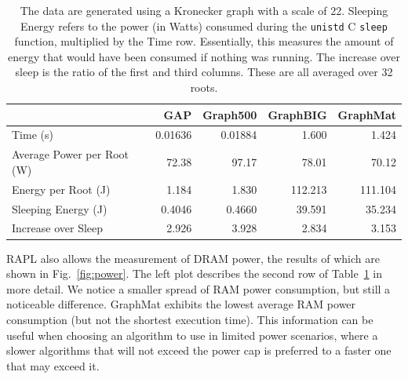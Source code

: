 \documentclass{llncs}
\begin{document}
\begin{table}
	\caption{The data are generated using a Kronecker graph with a scale of 22. Sleeping Energy refers to the power (in Watts) consumed during the \texttt{unistd} C \texttt{sleep} function, multiplied by the Time row. Essentially, this measures the amount of energy that would have been consumed if nothing was running. The increase over sleep is the ratio of the first and third columns. These are all averaged over 32 roots.}
	\centering
	\begin{tabular}{l|r|r|r|r}
			&	GAP  &    Graph500 & GraphBIG & GraphMat \\ \hline
		Time (s) &  0.01636 & 0.01884 & 1.600 & 1.424 \\
		Average Power per Root (W) & 72.38 & 97.17 & 78.01 & 70.12 \\
		Energy per Root (J) &	1.184 & 1.830 & 112.213 & 111.104 \\
		Sleeping Energy (J) & 0.4046  & 0.4660 & 39.591 &  35.234 \\
		Increase over Sleep & 2.926 & 3.928 & 2.834 & 3.153
	\end{tabular}
	\label{tab:power}
\end{table}

RAPL also allows the measurement of DRAM power, the results of which are shown in Fig.~\ref{fig:power}. The left plot describes the second row of Table~\ref{tab:power} in more detail. We notice a smaller spread of RAM power consumption, but still a noticeable difference. GraphMat exhibits the lowest average RAM power consumption (but not the shortest execution time). This information can be useful when choosing an algorithm to use in limited power scenarios, where a slower algorithms that will not exceed the power cap is preferred to a faster one that may exceed it.
\end{document}
